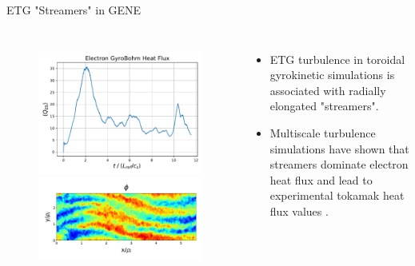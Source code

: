 \documentclass[aspectratio=43]{beamer}
\begin{document}
   \begin{frame}{ETG "Streamers" in GENE}
      \begin{columns}
         \begin{figure}
            \hspace*{-.3cm}\includegraphics[scale=.3]{Images/etgHeatFlux.pdf}
            \\
            \hspace*{-.3cm}\includegraphics[scale=.2]{Images/genePhiETG_sat2.pdf}
         \end{figure}
         \begin{itemize}
            \item ETG turbulence in toroidal gyrokinetic simulations is associated with radially elongated "streamers".
            \vspace{5mm}
            \item Multiscale turbulence simulations have shown that streamers dominate electron heat flux and lead
            to experimental tokamak heat flux values \cite{Howard}.
         \end{itemize}
      \end{columns}
   \end{frame}
\end{document}
